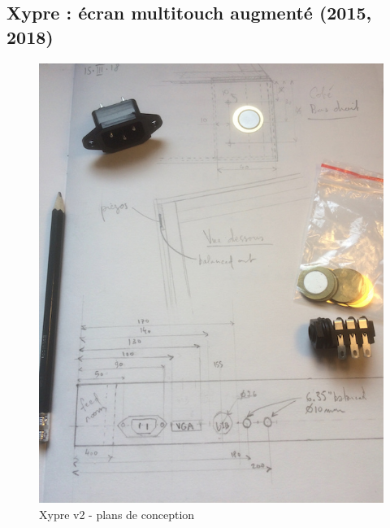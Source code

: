 \subsection{Xypre : écran multitouch augmenté (2015, 2018)}
\label{sec:interfaces:phylogenese:xypre}
\begin{figure}[!htbp]
	\captionsetup{format=plain}%
	\centering
	\begin{minipage}[t]{0.365\textwidth}
		\includegraphics[width=\linewidth]{gfx/05_interfaces/Xypre_plan01_72dpi.jpg}
		\caption{Xypre v2 - plans de conception}
		\label{fig:interface:xypre_plans}
	\end{minipage}
	\hspace{.01\linewidth}
	\begin{minipage}[t]{0.6\textwidth}

\end{minipage}
\end{figure}
